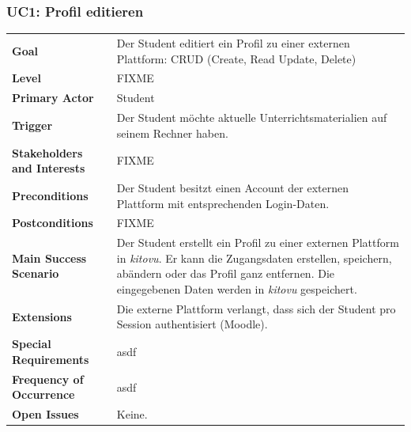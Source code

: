\documentclass[a4paper]{article}
\begin{document}
\subsubsection{UC1: Profil editieren}
\begin{tabulary}{\linewidth}{lp{30em}}
	\textbf{Goal} & Der Student editiert ein Profil zu einer externen Plattform: CRUD (Create, Read Update, Delete) \\
	\textbf{Level} & FIXME \\
	\textbf{Primary Actor} & Student\\
	\textbf{Trigger} & Der Student möchte aktuelle Unterrichtsmaterialien auf seinem Rechner haben.\\
	\textbf{Stakeholders and Interests} & FIXME \\
	\textbf{Preconditions} & Der Student besitzt einen Account der externen Plattform mit entsprechenden Login-Daten.\\
	\textbf{Postconditions} & FIXME \\
	\textbf{Main Success Scenario} & Der Student erstellt ein Profil zu einer externen Plattform in \emph{kitovu}. Er kann die Zugangsdaten erstellen, speichern, abändern oder das Profil ganz entfernen. Die eingegebenen Daten werden in \emph{kitovu} gespeichert. \\
	\textbf{Extensions} & Die externe Plattform verlangt, dass sich der Student pro Session authentisiert (Moodle).\\
	\textbf{Special Requirements} & asdf \\
	\textbf{Frequency of Occurrence} & asdf \\
	\textbf{Open Issues} & Keine. \\
\end{tabulary}
\end{document}
